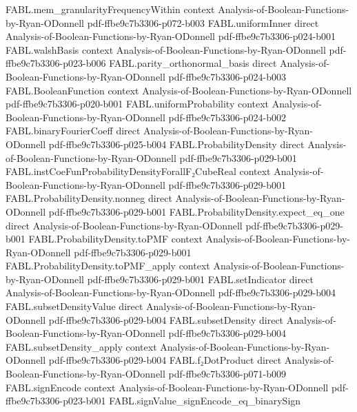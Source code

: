 \begin{theorem}
  {FABL.mem_granularityFrequencyWithin}
  {context}
  {Analysis-of-Boolean-Functions-by-Ryan-ODonnell}
  {pdf-ffbe9c7b3306-p072-b003}
\proofstep
  {FABL.uniformInner}
  {direct}
  {Analysis-of-Boolean-Functions-by-Ryan-ODonnell}
  {pdf-ffbe9c7b3306-p024-b001}
\proofstep
  {FABL.walshBasis}
  {context}
  {Analysis-of-Boolean-Functions-by-Ryan-ODonnell}
  {pdf-ffbe9c7b3306-p023-b006}
\proofstep
  {FABL.parity_orthonormal_basis}
  {direct}
  {Analysis-of-Boolean-Functions-by-Ryan-ODonnell}
  {pdf-ffbe9c7b3306-p024-b003}
\proofstep
  {FABL.BooleanFunction}
  {context}
  {Analysis-of-Boolean-Functions-by-Ryan-ODonnell}
  {pdf-ffbe9c7b3306-p020-b001}
\proofstep
  {FABL.uniformProbability}
  {context}
  {Analysis-of-Boolean-Functions-by-Ryan-ODonnell}
  {pdf-ffbe9c7b3306-p024-b002}
\proofstep
  {FABL.binaryFourierCoeff}
  {direct}
  {Analysis-of-Boolean-Functions-by-Ryan-ODonnell}
  {pdf-ffbe9c7b3306-p025-b004}
\proofstep
  {FABL.ProbabilityDensity}
  {direct}
  {Analysis-of-Boolean-Functions-by-Ryan-ODonnell}
  {pdf-ffbe9c7b3306-p029-b001}
\proofstep
  {FABL.instCoeFunProbabilityDensityForallF₂CubeReal}
  {context}
  {Analysis-of-Boolean-Functions-by-Ryan-ODonnell}
  {pdf-ffbe9c7b3306-p029-b001}
\proofstep
  {FABL.ProbabilityDensity.nonneg}
  {direct}
  {Analysis-of-Boolean-Functions-by-Ryan-ODonnell}
  {pdf-ffbe9c7b3306-p029-b001}
\proofstep
  {FABL.ProbabilityDensity.expect_eq_one}
  {direct}
  {Analysis-of-Boolean-Functions-by-Ryan-ODonnell}
  {pdf-ffbe9c7b3306-p029-b001}
\proofstep
  {FABL.ProbabilityDensity.toPMF}
  {context}
  {Analysis-of-Boolean-Functions-by-Ryan-ODonnell}
  {pdf-ffbe9c7b3306-p029-b001}
\proofstep
  {FABL.ProbabilityDensity.toPMF_apply}
  {context}
  {Analysis-of-Boolean-Functions-by-Ryan-ODonnell}
  {pdf-ffbe9c7b3306-p029-b001}
\proofstep
  {FABL.setIndicator}
  {direct}
  {Analysis-of-Boolean-Functions-by-Ryan-ODonnell}
  {pdf-ffbe9c7b3306-p029-b004}
\proofstep
  {FABL.subsetDensityValue}
  {direct}
  {Analysis-of-Boolean-Functions-by-Ryan-ODonnell}
  {pdf-ffbe9c7b3306-p029-b004}
\proofstep
  {FABL.subsetDensity}
  {direct}
  {Analysis-of-Boolean-Functions-by-Ryan-ODonnell}
  {pdf-ffbe9c7b3306-p029-b004}
\proofstep
  {FABL.subsetDensity_apply}
  {context}
  {Analysis-of-Boolean-Functions-by-Ryan-ODonnell}
  {pdf-ffbe9c7b3306-p029-b004}
\proofstep
  {FABL.f₂DotProduct}
  {direct}
  {Analysis-of-Boolean-Functions-by-Ryan-ODonnell}
  {pdf-ffbe9c7b3306-p071-b009}
\proofstep
  {FABL.signEncode}
  {context}
  {Analysis-of-Boolean-Functions-by-Ryan-ODonnell}
  {pdf-ffbe9c7b3306-p023-b001}
\proofstep
  {FABL.signValue_signEncode_eq_binarySign}

\end{theorem}

